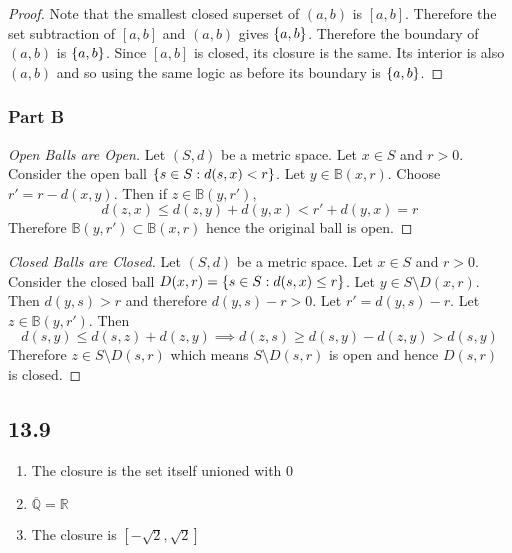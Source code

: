 \documentclass[12pt,titlepage]{extarticle}
\begin{document}
\begin{proof}
    Note that the smallest closed superset of $(a,b)$ is $[a,b]$. Therefore the set subtraction of $[a,b]$ and $(a,b)$ gives $\qty{a,b}$. Therefore the boundary of $(a,b)$ is $\qty{a,b}$. Since $[a,b]$ is closed, its closure is the same. Its interior is also $(a,b)$ and so using the same logic as before its boundary is $\qty{a,b}$.
\end{proof}

\subsubsection*{Part B}
\begin{proof}[Open Balls are Open]
    Let $(S,d)$ be a metric space. Let $x \in S$ and $r > 0$. Consider the open ball $\qty{s \in S : d(s,x) < r}$. Let $y \in \mathbb{B}(x,r)$. Choose $r' = r - d(x,y)$. Then if $z \in \mathbb{B}(y,r')$,
    \[
        d(z,x) \leq d(z, y) + d(y, x) < r' + d(y,x) = r
    \]
    Therefore $\mathbb{B}(y, r') \subset \mathbb{B}(x,r)$ hence the original ball is open.
\end{proof}

\begin{proof}[Closed Balls are Closed]
    Let $(S,d)$ be a metric space. Let $x \in S$ and $r > 0$. Consider the closed ball $D(x,r) = \qty{s \in S : d(s,x) \leq r}$. Let $y \in S \setminus D(x,r)$. Then $d(y,s) > r$ and therefore $d(y,s) - r > 0$. Let $r' = d(y, s) - r$. Let $z \in \mathbb{B}(y, r')$. Then
    \[
        d(s,y) \leq d(s,z) + d(z,y) \implies d(z, s) \geq d(s,y) - d(z,y) > d(s,y)
    \]
    Therefore $z \in S \setminus D(s,r)$ which means $S \setminus D(s,r)$ is open and hence $D(s,r)$ is closed.
\end{proof}

\subsection*{13.9}
\begin{enumerate}[label=\alph*)]
    \item The closure is the set itself unioned with $\qty{0}$
    \item $\overline{\mathbb{Q}} = \mathbb{R}$
    \item The closure is $[-\sqrt{2}, \sqrt{2}]$
\end{enumerate}
\end{document}
